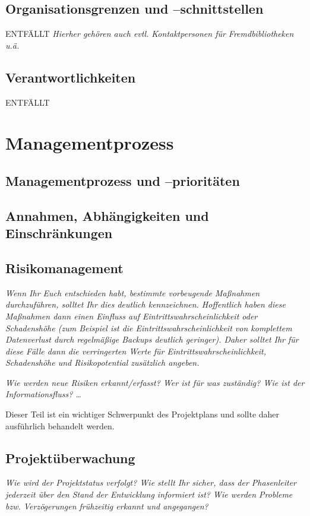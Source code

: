 \documentclass[fontsize=12pt,paper=a4,twoside]{scrartcl}
\begin{document}
\subsection{Organisationsgrenzen und --schnittstellen}
ENTFÄLLT
{\em Hierher gehören auch evtl. Kontaktpersonen für Fremdbibliotheken u.ä.}

\subsection{Verantwortlichkeiten}
ENTFÄLLT
\section{Managementprozess}

\subsection{Managementprozess und --prioritäten}

\subsection{Annahmen, Abhängigkeiten und Einschränkungen}

\subsection{Risikomanagement}\label{riskmanagement}

{\em Wenn Ihr Euch entschieden habt, bestimmte vorbeugende Maßnahmen 
     durchzuführen, solltet Ihr dies deutlich kennzeichnen. Hoffentlich
     haben diese Maßnahmen dann einen Einfluss auf Eintrittswahrscheinlichkeit oder Schadenshöhe (zum Beispiel
     ist die Eintrittswahrscheinlichkeit von komplettem Datenverlust durch regelmäßige Backups deutlich 
     geringer). Daher solltet Ihr für diese Fälle dann die verringerten Werte für Eintrittswahrscheinlichkeit, 
     Schadenshöhe und Risikopotential zusätzlich angeben. }

{\em Wie werden neue Risiken erkannt/erfasst? Wer ist für was
  zuständig? Wie ist der Informationsfluss? \ldots 

Dieser Teil ist ein
  wichtiger Schwerpunkt des Projektplans und sollte daher ausführlich
  behandelt werden.}

\subsection{Projektüberwachung}\label{3.4-controlling}
{\em Wie wird der Projektstatus verfolgt? Wie stellt Ihr sicher, dass
  der Phasenleiter jederzeit über den Stand der Entwicklung informiert
  ist? Wie werden Probleme bzw. Verzögerungen frühzeitig erkannt und
  angegangen?}
\end{document}
